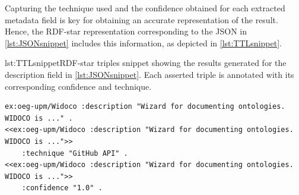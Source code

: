 Capturing the technique used and the confidence obtained for each extracted metadata field is key for obtaining an accurate representation of the result. Hence, the \mbox{RDF-star} representation corresponding to the JSON in \cref{lst:JSONsnippet} includes this information, as depicted in \cref{lst:TTLsnippet}.



\begin{captionedlisting}{lst:TTLsnippet}{RDF-star triples snippet showing the results generated for the description field in \cref{lst:JSONsnippet}. Each asserted triple is annotated with its corresponding confidence and technique.}
\centering
{
\begin{lstlisting}[basicstyle=\ttfamily\small,label={list:example1},columns=flexible]
ex:oeg-upm/Widoco :description "Wizard for documenting ontologies. WIDOCO is ..." .
<<ex:oeg-upm/Widoco :description "Wizard for documenting ontologies. WIDOCO is ...">> 
    :technique "GitHub API" .
<<ex:oeg-upm/Widoco :description "Wizard for documenting ontologies. WIDOCO is ...">> 
    :confidence "1.0" .
\end{lstlisting}
}
\end{captionedlisting}


